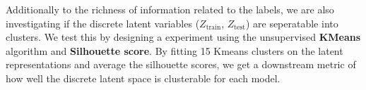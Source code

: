 Additionally to the richness of information related to the labels, we are also investigating if the discrete latent variables ($Z_\text{train}$, $Z_\text{test}$) are seperatable into clusters. We test this by designing a experiment using the unsupervised \textbf{KMeans} algorithm and \textbf{Silhouette score}.
By fitting 15 Kmeans clusters on the latent representations  and average the silhouette scores, we get a downstream metric of how well the discrete latent space is clusterable for each model. 




